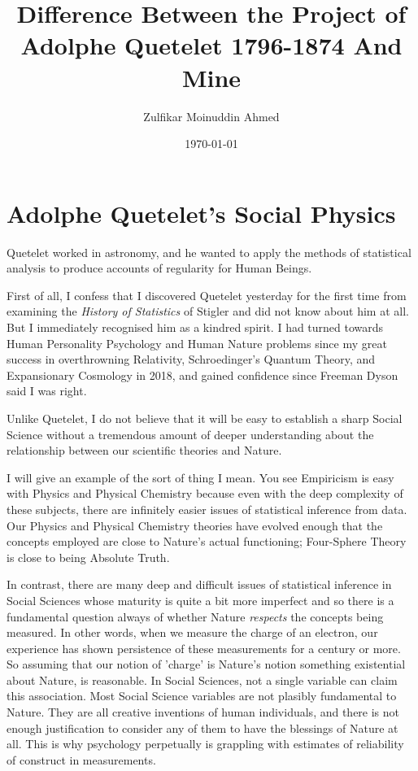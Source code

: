 \documentclass{amsart}
\title{Difference Between the Project of Adolphe Quetelet 1796-1874 And Mine}
\author{Zulfikar Moinuddin Ahmed}
\date{\today}
\begin{document}
\maketitle

\section{Adolphe Quetelet's Social Physics}

Quetelet worked in astronomy, and he wanted to apply the methods of statistical analysis to produce accounts of regularity for Human Beings.  

First of all, I confess that I discovered Quetelet yesterday for the first time from examining the {\em History of Statistics} of Stigler and did not know about him at all.  But I immediately recognised him as a kindred spirit.  I had turned towards Human Personality Psychology and Human Nature problems since my great success in overthrowning Relativity, Schroedinger's Quantum Theory, and Expansionary Cosmology in 2018, and gained confidence since Freeman Dyson said I was right.  

Unlike Quetelet, I do not believe that it will be easy to establish a sharp Social Science without a tremendous amount of deeper understanding about the relationship between our scientific theories and Nature.  

I will give an example of the sort of thing I mean.  You see Empiricism is easy with Physics and Physical Chemistry because even with the deep complexity of these subjects, there are infinitely easier issues of statistical inference from data.  Our Physics and Physical Chemistry theories have evolved enough that the concepts employed are close to Nature's actual functioning; Four-Sphere Theory is close to being Absolute Truth.

In contrast, there are many deep and difficult issues of statistical inference in Social Sciences whose maturity is quite a bit more imperfect and so there is a fundamental question always of whether Nature {\em respects} the concepts being measured.  In other words, when we measure the charge of an electron, our experience has shown persistence of these measurements for a century or more.  So assuming that our notion of 'charge' is Nature's notion something existential about Nature, is reasonable.  In Social Sciences, not a single variable can claim this association.  Most Social Science variables are not plasibly fundamental to Nature.  They are all creative inventions of human individuals, and there is not enough justification to consider any of them to have the blessings of Nature at all.  This is why psychology perpetually is grappling with estimates of reliability of construct in measurements.
\end{document}
